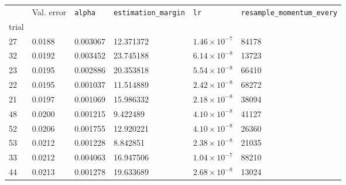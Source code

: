 \begin{tabular}{lp{2.3cm}p{2.3cm}p{2.3cm}p{2.3cm}p{2.3cm}}
\toprule
{} &  Val. error &  \texttt{alpha} &  \texttt{estimation\_margin} &         \texttt{lr} &  \texttt{resample\_momentum\_every} \\
trial &             &                 &                              &                     &                                     \\
\midrule
27    &      0.0188 &        0.003067 &                    12.371372 & $1.46\times10^{-7}$ &                               84178 \\
32    &      0.0192 &        0.003452 &                    23.745188 & $6.14\times10^{-8}$ &                               13723 \\
23    &      0.0195 &        0.002886 &                    20.353818 & $5.54\times10^{-8}$ &                               66410 \\
22    &      0.0195 &        0.001037 &                    11.514889 & $2.42\times10^{-8}$ &                               68272 \\
21    &      0.0197 &        0.001069 &                    15.986332 & $2.18\times10^{-8}$ &                               38094 \\
48    &      0.0200 &        0.001215 &                     9.422489 & $4.10\times10^{-8}$ &                               41127 \\
52    &      0.0206 &        0.001755 &                    12.920221 & $4.10\times10^{-8}$ &                               26360 \\
53    &      0.0212 &        0.001228 &                     8.842851 & $2.38\times10^{-8}$ &                               21035 \\
33    &      0.0212 &        0.004063 &                    16.947506 & $1.04\times10^{-7}$ &                               88210 \\
44    &      0.0213 &        0.001278 &                    19.633689 & $2.68\times10^{-8}$ &                               13024 \\
\bottomrule
\end{tabular}
